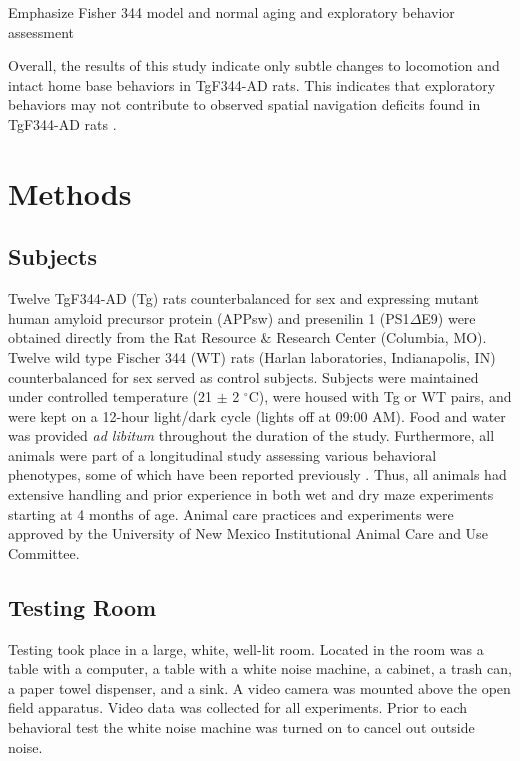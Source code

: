 \documentclass[fleqn,10pt]{wlscirep}
\begin{document}
Emphasize Fisher 344 model and normal aging and exploratory behavior assessment

Overall, the results of this study indicate only subtle changes to locomotion and intact home base behaviors in TgF344-AD rats. This indicates that exploratory behaviors may not contribute to observed spatial navigation deficits found in TgF344-AD rats \cite{berkowitz_progressive_2018}. 

\section*{Methods}

\subsection*{Subjects} 
Twelve TgF344-AD (Tg) rats counterbalanced for sex and expressing mutant human amyloid precursor protein (APPsw) and presenilin 1 (PS1$\Delta$E9) were obtained directly from the Rat Resource \& Research Center (Columbia, MO). Twelve wild type Fischer 344 (WT) rats (Harlan laboratories, Indianapolis, IN) counterbalanced for sex served as control subjects. Subjects were maintained under controlled temperature (21 $\pm$ 2 $^{\circ}$C), were housed with Tg or WT pairs, and were kept on a 12-hour light/dark cycle (lights off at 09:00 AM). Food and water was provided \textit{ad libitum} throughout the duration of the study. Furthermore, all animals were part of a longitudinal study assessing various behavioral phenotypes, some of which have been reported previously \cite{berkowitz_progressive_2018,pentkowski_anxiety-like_2018}. Thus, all animals had extensive handling and prior experience in both wet and dry maze experiments starting at 4 months of age. Animal care practices and experiments were approved by the University of New Mexico Institutional Animal Care and Use Committee.

\subsection*{Testing Room}
Testing took place in a large, white, well-lit room. Located in the room was a table with a computer, a table with a white noise machine, a cabinet, a trash can, a paper towel dispenser, and a sink. A video camera was mounted above the open field apparatus. Video data was collected for all experiments. Prior to each behavioral test the white noise machine was turned on to cancel out outside noise.
\end{document}
